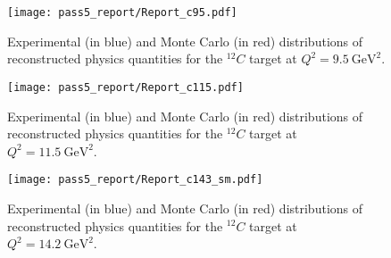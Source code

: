 \begin{figure}[!h]
    \centering
    \texttt{[image: pass5\_report/Report\_c95.pdf]}
    \caption{
            Experimental (in blue) and Monte Carlo (in red) distributions of
            reconstructed physics quantities for
            the ${}^{12}C$ target at $Q^2=\SI{9.5}{\giga\electronvolt\squared}$.
            }
    \label{fig:Report_c95.pdf}
\end{figure}


\begin{figure}[!h]
    \centering
    \texttt{[image: pass5\_report/Report\_c115.pdf]}
    \caption{
            Experimental (in blue) and Monte Carlo (in red) distributions of
            reconstructed physics quantities for
            the ${}^{12}C$ target at $Q^2=\SI{11.5}{\giga\electronvolt\squared}$.
            }
    \label{fig:Report_c115.pdf}
\end{figure}


\begin{figure}[!h]
    \centering
    \texttt{[image: pass5\_report/Report\_c143\_sm.pdf]}
    \caption{
            Experimental (in blue) and Monte Carlo (in red) distributions of
            reconstructed physics quantities for
            the ${}^{12}C$ target at $Q^2=\SI{14.2}{\giga\electronvolt\squared}$.
            }
    \label{fig:Report_c143_sm.pdf}
\end{figure}


